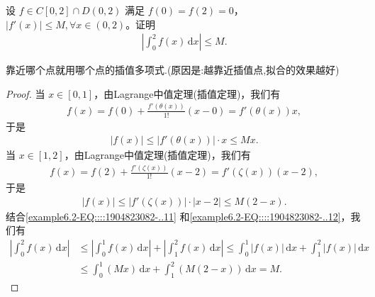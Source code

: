 \documentclass[../../main.tex]{subfiles}
\begin{document}
\begin{example}
设 $f \in C[0,2] \cap D(0,2)$ 满足 $f(0) = f(2) = 0$，$|f'(x)| \leqslant  M, \forall x \in (0,2)$。证明
\begin{align*}
\left| \int_{0}^{2} f(x) \, \mathrm{d}x \right| \leqslant  M.
\end{align*}
\end{example}
\begin{note}
靠近哪个点就用哪个点的插值多项式.(原因是:越靠近插值点,拟合的效果越好)
\end{note}
\begin{proof}
当 $x \in [0,1]$，由Lagrange中值定理(插值定理)，我们有
\begin{align*}
f(x) = f(0) + \frac{f'(\theta(x))}{1!} (x - 0) = f'(\theta(x)) x,
\end{align*}
于是
\begin{align}
|f(x)| \leqslant  |f'(\theta(x))| \cdot x \leqslant  Mx.\label{example6.2-EQ::::1904823082-..11}
\end{align}
当 $x \in [1,2]$，由Lagrange中值定理(插值定理)，我们有
\begin{align*}
f(x) = f(2) + \frac{f'(\zeta(x))}{1!} (x - 2) = f'(\zeta(x)) (x - 2),
\end{align*}
于是
\begin{align}
|f(x)| \leqslant  |f'(\zeta(x))| \cdot |x - 2| \leqslant  M(2 - x).\label{example6.2-EQ::::1904823082-..12}
\end{align}
结合\eqref{example6.2-EQ::::1904823082-..11} 和\eqref{example6.2-EQ::::1904823082-..12}，我们有
\begin{align*}
\left| \int_{0}^{2} f(x) \, \mathrm{d}x \right| &\leqslant  \left| \int_{0}^{1} f(x) \, \mathrm{d}x \right| + \left| \int_{1}^{2} f(x) \, \mathrm{d}x \right| 
\leqslant  \int_{0}^{1} |f(x)| \, \mathrm{d}x + \int_{1}^{2} |f(x)| \, \mathrm{d}x \\
&\leqslant  \int_{0}^{1} (Mx) \, \mathrm{d}x + \int_{1}^{2} (M(2 - x)) \, \mathrm{d}x 
= M.
\end{align*}
\end{proof}
\end{document}

